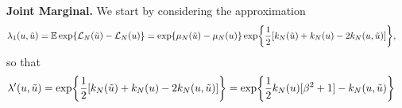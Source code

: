 \documentclass[12pt]{article}
\begin{document}
\vspace*{10px}

\noindent
\textbf{Joint Marginal.} We start by considering the approximation
\begin{align}
\lambda_1(u, \tilde{u}) &= \mathbb{E}\exp\mathopen{}\left\{\mathcal{L}_{N}(\tilde{u}) - \mathcal{L}_{N}(u)\right\}\mathclose{}
= \exp\mathopen{}\left\{\mu_{N}(\tilde{u}) - \mu_{N}(u)\right\}\mathclose{}\exp\mathopen{}\left\{\frac{1}{2}[k_{N}(\tilde{u}) + k_{N}(u) - 2k_{N}(u, \tilde{u})]\right\}\mathclose{},
\end{align} 
so that
\begin{align}
\lambda^\prime(u, \tilde{u}) &= \exp\mathopen{}\left\{\frac{1}{2}[k_{N}(\tilde{u}) + k_{N}(u) - 2k_{N}(u, \tilde{u})]\right\}\mathclose{}
= \exp\mathopen{}\left\{\frac{1}{2}k_{N}(u)[\beta^2 + 1] - k_{N}(u, \tilde{u})\right\}\mathclose{}
\end{align}
\end{document}
